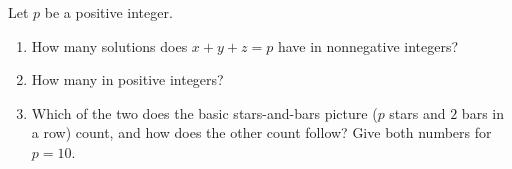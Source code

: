 Let $p$ be a positive integer.
\begin{enumerate}
\item[(a)] How many solutions does $x+y+z=p$ have in nonnegative integers?
\item[(b)] How many in positive integers?
\item[(c)] Which of the two does the basic stars-and-bars picture ($p$ stars and $2$ bars in a row) count, and how does the other count follow? Give both numbers for $p=10$.
\end{enumerate}

